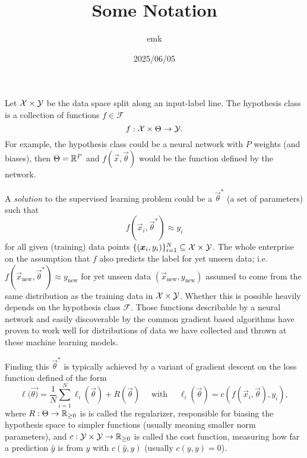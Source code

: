 \documentclass[12pt]{amsart}
\title{Some Notation}
\author{emk}
\date{2025/06/05}
\begin{document}
\maketitle

Let $\mathcal{X} \times \mathcal{Y}$ be the data space split along an input-label line. The hypothesis class is a collection of functions $f \in \mathcal{F}$
\[
	f : \mathcal{X} \times \Theta \to \mathcal{Y}.
\]
For example, the hypothesis class could be a neural network with $P$ weights (and biases), then $\Theta = \mathbb{R}^P$ and $f(\vec{x}, \vec{\theta})$ would be the function defined by the network.

A \emph{solution} to the supervised learning problem could be a $\vec{\theta}^*$ (a set of parameters) such that $$f(\vec{x}_i, \vec{\theta}^*) \approx y_i$$
for all given (training) data points $\{(\mathbf{\boldsymbol{x}}_i, y_i)\}_{i = 1}^N \subseteq \mathcal{X} \times \mathcal{Y}$. The whole enterprise on the assumption that $f$ also predicts the label for yet unseen data; i.e. $f(\vec{x}_{\text{new}}, \vec{\theta}^*) \approx y_{\text{new}}$ for yet unseen data $(\vec{x}_{\text{new}}, y_{\text{new}})$ assumed to come from the same distribution as the training data in $\mathcal{X} \times \mathcal{Y}$. Whether this is possible heavily depends on the hypothesis class $\mathcal{F}$. Those functions describable by a neural network and easily discoverable by the common gradient based algorithms have proven to work well for distributions of data we have collected and thrown at these machine learning models.

Finding this $\vec \theta^*$ is typically achieved by a variant of gradient descent on the loss function defined of the form
\begin{equation}\label{eq:lossfn}
	\ell(\vec{\theta)} = \frac{1}{N} \sum_{i = 1}^N \ell_i(\vec{\theta}) + R(\vec{\theta}) \quad \text{ with } \quad \ell_i(\vec{\theta}) = c(f(\vec{x}_i, \vec{\theta}), y_i),
\end{equation}
where $R :\Theta \to \mathbb{R}_{\geq 0 }$ is is called the regularizer, responsible for biasing the hypothesis space to simpler functions (usually meaning smaller norm parameters), and $c : \mathcal{Y} \times \mathcal{Y} \to \mathbb{R}_{\geq 0}$ is called the cost function, measuring how far a prediction $\hat y$ is from $y$ with  $c(\hat y, y)$ (usually $c(y, y) = 0$). 
\end{document}
